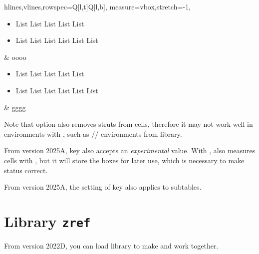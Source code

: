 \documentclass[oneside]{book}
\begin{document}
\begin{codehigh}
\begin{tblr}{
  hlines,vlines,rowspec={Q[l,t]Q[l,b]},
  measure=vbox,stretch=-1,
}
  \begin{itemize}[nosep]
    \item List List List List List
    \item List List List List List List
  \end{itemize} & oooo \\
  \begin{itemize}[nosep]
    \item List List List List List
    \item List List List List List List
  \end{itemize} & gggg \\
\end{tblr}
\end{codehigh}

Note that option  also removes struts from cells, therefore it may not work well
in  environments with , such as
// environments from  library.

From version 2025A,  key also accepts an \emph{experimental}  value.
With ,  also measures cells with \CC{\vbox},
but it will store the boxes for later use,
which is necessary to make \CC{\lTblrMeasuringBool} status correct.

From version 2025A, the setting of  key also applies to subtables.

\section{Library \texttt{zref}}

From version 2022D, you can load  library
to make \CC{\zref} and  work together.
\end{document}
